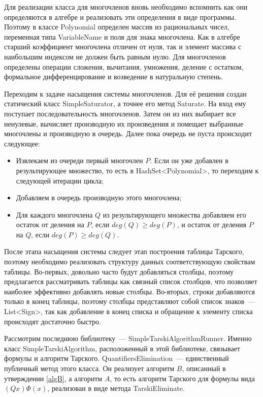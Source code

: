 Для реализации класса для многочленов вновь необходимо вспомнить как они определяются в алгебре и реализовать эти определения в виде программы. Поэтому в классе Polynomial определен массив из рациональных чисел, переменная типа VariableName и поля для знака многочлена. Как в алгебре старший коэффициент многочлена отличен от нуля, так и элемент массива с наибольшим индексом не должен быть равным нулю. Для многочленов определены операции сложения, вычитания, умножения, деление с остатком, формальное дифференцирование и возведение в натуральную степень.

Переходим к задаче насыщения системы многочленов. Для её решения создан статический класс SimpleSaturator, а точнее его метод Saturate. На вход ему поступает последовательность многочленов. Затем он из них выбирает все ненулевые, вычисляет производную их произведения и помещает выбранные многочлены и производную в очередь. Далее пока очередь не пуста происходит следующее:
\begin{itemize}
    \item Извлекаем из очереди первый многочлен $P$. Если он уже добавлен в результирующее множество, то есть в HashSet<Polynomial>, то переходим к следующей итерации цикла;
    \item Добавляем в очередь производную этого многочлена;
    \item Для каждого многочлена $Q$ из результирующего множества добавляем его остаток от деления на $P$, если $deg(Q) \geq deg(P)$, и остаток от деления $P$ на $Q$, если $deg(P) \geq deg(Q)$.
\end{itemize} 

После этапа насыщения системы следует этап построения таблицы Тарского, поэтому необходимо реализовать структуру данных соответствующую свойствам таблицы. Во-первых, довольно часто будут добавляться столбцы, поэтому предлагается рассматривать таблицы как связный список столбцов, что позволяет наиболее эффективно добавлять новые столбцы. Во-вторых, строки добавляются только в конец таблицы, поэтому столбцы представляют собой список знаков~--- List<Sign>, так как добавление в конец списка и обращение к элементу списка происходят достаточно быстро.

Рассмотрим последнюю библиотеку~--- SimpleTarskiAlgorithmRunner. Именно класс SimpleTarskiAlgorithm, расположенный в этой библиотеке, связывает формулы и алгоритм Тарского. QuantifiersElimination~--- единственный публичный метод этого класса. Он реализует алгоритм $B$, описанный в утверждении \ref{algB}, а алгоритм $A$, то есть алгоритм Тарского для формулы вида $(Qx)\Phi(x)$, реализован в виде метода TarskiEliminate.

